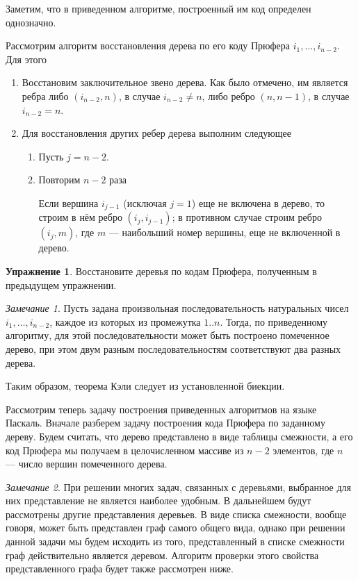 \documentclass[12pt,a4paper]{article}
\theoremstyle{plain}
\theoremstyle{definition}
\newtheorem*{task}{Упражнение}
\theoremstyle{remark}
\newtheorem*{remark}{Замечание}
\begin{document}
Заметим, что в приведенном алгоритме, построенный им код определен однозначно.

Рассмотрим алгоритм восстановления дерева по его коду Прюфера $i_1,\ldots,i_{n-2}$. Для этого
\begin{enumerate}
\item Восстановим заключительное звено дерева. Как было отмечено, им является ребра либо $(i_{n-2},n)$, в случае $i_{n-2}\ne n$, либо ребро $(n,n-1)$, в случае $i_{n-2}=n$.
\item Для восстановления других ребер дерева выполним следующее
    \begin{enumerate}
    \item Пусть $j=n-2$.
    \item Повторим $n-2$ раза

          Если вершина $i_{j-1}$ (исключая $j=1$) еще не включена в дерево, то строим в нём ребро $(i_j,i_{j-1})$; в противном случае строим ребро $(i_j,m)$, где $m$ --- наибольший номер вершины, еще не включенной в дерево.
    \end{enumerate}
\end{enumerate}

\begin{task}
Восстановите деревья по кодам Прюфера, полученным в предыдущем упражнении.
\end{task}

\begin{remark}
Пусть задана произвольная последовательность натуральных чисел $i_1,\ldots,i_{n-2}$, каждое из которых из промежутка $1..n$. Тогда, по приведенному алгоритму, для этой последовательности может быть построено помеченное дерево, при этом двум разным последовательностям соответствуют два разных дерева.
\end{remark}

Таким образом, теорема Кэли следует из установленной биекции.

Рассмотрим теперь задачу построения приведенных алгоритмов на языке Паскаль. Вначале разберем задачу построения кода Прюфера по заданному дереву. Будем считать, что дерево представлено в виде таблицы смежности, а его код Прюфера мы получаем в целочисленном массиве из $n-2$ элементов, где $n$ --- число вершин помеченного дерева.

\begin{remark}
При решении многих задач, связанных с деревьями, выбранное для них представление не является наиболее удобным. В дальнейшем будут рассмотрены другие представления деревьев. В виде списка смежности, вообще говоря, может быть представлен граф самого общего вида, однако при решении данной задачи мы будем исходить из того, представленный в списке смежности граф действительно является деревом. Алгоритм проверки этого свойства представленного графа будет также рассмотрен ниже.
\end{remark}
\end{document}
